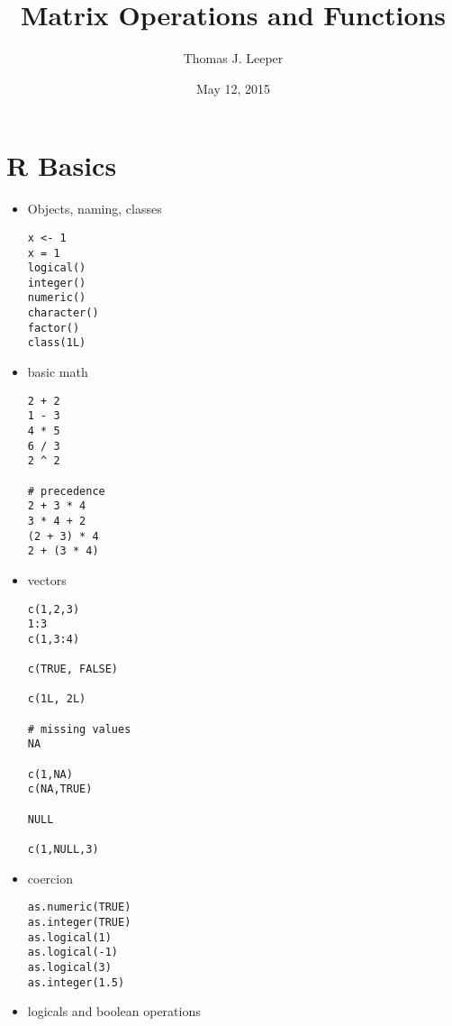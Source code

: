 \documentclass[a4paper,12pt]{article}
\title{Matrix Operations and Functions}
\author{Thomas J. Leeper}
\date{May 12, 2015}
\begin{document}
\maketitle

\doublespacing

\section{R Basics}











\begin{itemize}

\item Objects, naming, classes

\begin{lstlisting}
x <- 1
x = 1
logical()
integer()
numeric()
character()
factor()
class(1L)
\end{lstlisting}

\item basic math

\begin{lstlisting}
2 + 2
1 - 3
4 * 5
6 / 3
2 ^ 2

# precedence
2 + 3 * 4
3 * 4 + 2
(2 + 3) * 4
2 + (3 * 4)
\end{lstlisting}



\item vectors

\begin{lstlisting}
c(1,2,3)
1:3
c(1,3:4)

c(TRUE, FALSE)

c(1L, 2L)

# missing values
NA

c(1,NA)
c(NA,TRUE)

NULL

c(1,NULL,3)
\end{lstlisting}

\item coercion

\begin{lstlisting}
as.numeric(TRUE)
as.integer(TRUE)
as.logical(1)
as.logical(-1)
as.logical(3)
as.integer(1.5)
\end{lstlisting}

\item logicals and boolean operations


\end{itemize}
\end{document}
